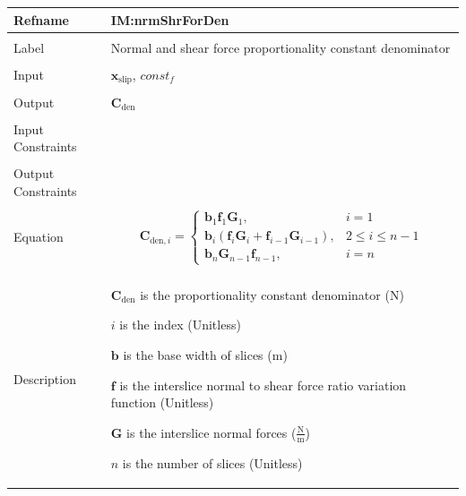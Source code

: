 \documentclass[12pt]{article}
\begin{document}
\noindent \begin{minipage}{\textwidth}
\begin{tabular}{>{\raggedright}p{}>{\raggedright\arraybackslash}p{}}
\toprule \textbf{Refname} & \textbf{IM:nrmShrForDen}
\label{IM:nrmShrForDen}
\\ \midrule \\
Label & Normal and shear force proportionality constant denominator
\\ \midrule \\
Input & ${\mathbf{x}_{\text{slip}}}$, $const_f$
\\ \midrule \\
Output & ${\mathbf{C}_{\text{den}}}$
\\ \midrule \\
Input Constraints & 
\\ \midrule \\
Output Constraints & 
\\ \midrule \\
Equation & \begin{displaymath}
           {\mathbf{C}_{\text{den},i}}=\begin{cases}
                                       {\mathbf{b}}_{1} {\mathbf{f}}_{1} {\mathbf{G}}_{1}, & i=1\\
{\mathbf{b}}_{i} \left({\mathbf{f}}_{i} {\mathbf{G}}_{i}+{\mathbf{f}}_{i-1} {\mathbf{G}}_{i-1}\right), & 2\leq{}i\leq{}n-1\\
{\mathbf{b}}_{n} {\mathbf{G}}_{n-1} {\mathbf{f}}_{n-1}, & i=n
                                       \end{cases}
           \end{displaymath}
\\ \midrule \\
Description & \begin{symbDescription}
              \item{${\mathbf{C}_{\text{den}}}$ is the proportionality constant denominator (N)}
              \item{$i$ is the index (Unitless)}
              \item{$\mathbf{b}$ is the base width of slices (m)}
              \item{$\mathbf{f}$ is the interslice normal to shear force ratio variation function (Unitless)}
              \item{$\mathbf{G}$ is the interslice normal forces ($\frac{\text{N}}{\text{m}}$)}
              \item{$n$ is the number of slices (Unitless)}

\end{symbDescription}
\end{tabular}
\end{minipage}
\end{document}
